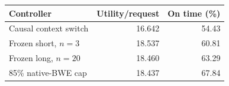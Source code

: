 \begin{tabular}{lrr}
\toprule
Controller & Utility/request & On time (\%)\\
\midrule
Causal context switch & 16.642 & 54.43\\
Frozen short, $n=3$ & 18.537 & 60.81\\
Frozen long, $n=20$ & 18.460 & 63.29\\
85\% native-BWE cap & 18.437 & 67.84\\
\bottomrule
\end{tabular}
